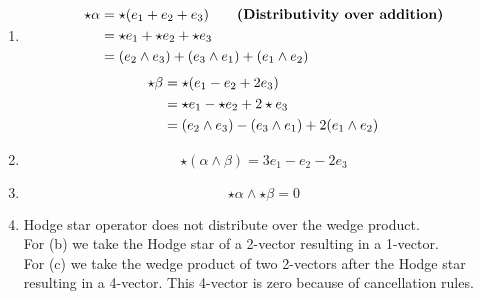 \documentclass{article}
\begin{document}
\vspace{1.8cm}
\\\\


\begin{enumerate}[label=(\alph*)]
    \item
    \begin{align}
        \star \alpha &= \star(e_1 + e_2 + e_3) \tag*{\bfseries(Distributivity over addition)}\\
            &= \star e_1 + \star e_2 + \star e_3 \notag\\
            &= (e_2 \wedge e_3) + (e_3 \wedge e_1) + (e_1 \wedge e_2) \notag
    \end{align}
    \begin{align}
        \star \beta &= \star(e_1 - e_2 + 2e_3) \notag\\
            &= \star e_1 - \star e_2 + 2 \star e_3 \notag\\
            &= (e_2 \wedge e_3) - (e_3 \wedge e_1) +2 (e_1 \wedge e_2) \notag
    \end{align}

    \item
        $$\star(\alpha \wedge \beta) = 3e_1 - e_2 - 2e_3$$

    \item
        $$\star\alpha \wedge \star\beta = 0$$

    \item 
        Hodge star operator does not distribute over the wedge product.\\
        For (b) we take the Hodge star of a 2-vector resulting in a 1-vector.\\
        For (c) we take the wedge product of two 2-vectors after the Hodge star resulting in a 4-vector. 
        This 4-vector is zero because of cancellation rules.
\end{enumerate}



\vspace{1.8cm}
\\\\
\end{document}
